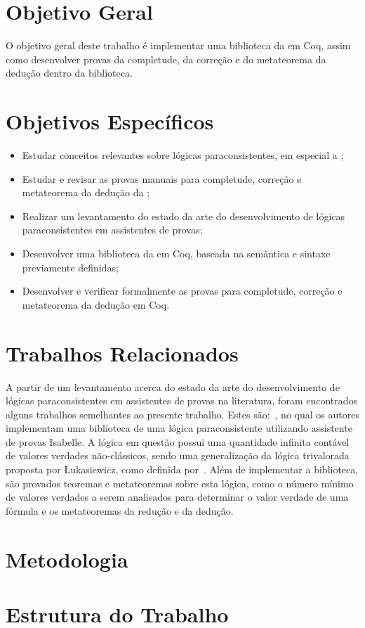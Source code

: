     \section{Objetivo Geral}
    O objetivo geral deste trabalho é implementar uma biblioteca da \lfium{} em Coq, assim como desenvolver provas da completude, da correção e do metateorema da dedução dentro da biblioteca.


    \section{Objetivos Específicos}
    \begin{itemize}
        \item Estudar conceitos relevantes sobre lógicas paraconsistentes, em especial a \lfium{};
        \item Estudar e revisar as provas manuais para completude, correção e metateorema da dedução da \lfium{};
        \item Realizar um levantamento do estado da arte do desenvolvimento de lógicas paraconsistentes em assistentes de provas;
        \item Desenvolver uma biblioteca da \lfium{} em Coq, baseada na semântica e sintaxe previamente definidas;
        \item Desenvolver e verificar formalmente as provas para completude, correção e metateorema da dedução em Coq.
    \end{itemize}


    \section{Trabalhos Relacionados}
    A partir de um levantamento acerca do estado da arte do desenvolvimento de lógicas paraconsistentes em assistentes de provas na literatura, foram encontrados alguns trabalhos semelhantes ao presente trabalho. Estes são:~, no qual os autores implementam uma biblioteca de uma lógica paraconsistente utilizando assistente de provas Isabelle. A lógica em questão possui uma quantidade infinita contável de valores verdades não-clássicos, sendo uma generalização da lógica trivalorada proposta por {\L}ukasiewicz, como definida por~. Além de implementar a biblioteca, são provados teoremas e metateoremas sobre esta lógica, como o número mínimo de valores verdades a serem analisados para determinar o valor verdade de uma fórmula e os metateoremas da redução e da dedução.


    \section{Metodologia}
        

    \section{Estrutura do Trabalho}
       
